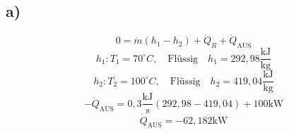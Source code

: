 

\subsection*{a)}
\[
0 = \dot{m} (h_1 - h_2) + \dot{Q}_R + \dot{Q}_{\text{AUS}}
\]
\[
h_1: T_1 = 70^\circ C, \quad \text{Flüssig} \quad h_1 = 292,98 \frac{\text{kJ}}{\text{kg}}
\]
\[
h_2: T_2 = 100^\circ C, \quad \text{Flüssig} \quad h_2 = 419,04 \frac{\text{kJ}}{\text{kg}}
\]
\[
-\dot{Q}_{\text{AUS}} = 0,3 \frac{\text{kJ}}{\text{s}} (292,98 - 419,04) + 100 \text{kW}
\]
\[
\dot{Q}_{\text{AUS}} = -62,182 \text{kW}
\]